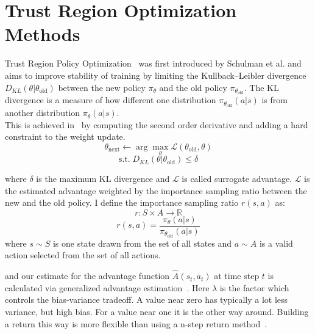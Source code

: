 \documentclass{article}
\begin{document}
\section{Trust Region Optimization Methods}

Trust Region Policy Optimization~\cite{pmlr-v37-schulman15} was first introduced by Schulman et al.
and aims to improve stability of training by limiting the Kullback–Leibler divergence $D_{KL}(\theta|\theta_{\text{old}})$
between the new policy $\pi_\theta$ and the old policy $\pi_{\theta_{\text{old}}}$. The KL divergence is a measure of how different
one distribution $\pi_{\theta_{\text{old}}}(a|s)$ is from another distribution $\pi_\theta(a|s)$.\\

\noindent This is achieved in~\cite{pmlr-v37-schulman15} by computing the second order derivative and adding 
a hard constraint to the weight update. 
\begin{equation}
    \theta_{\text{next}} \xleftarrow{} \arg \max_{\theta} {\mathcal L}(\theta_{\text{old}}, \theta) 
\end{equation}
\begin{equation*}
    \text{s.t.} \; {D}_{KL}(\theta|\theta_{\text{old}}) \leq \delta
\end{equation*}

\noindent where $\delta$ is the maximum KL divergence and ${\mathcal L}$ is called surrogate 
advantage. ${\mathcal L}$ is the estimated advantage weighted by the importance
sampling ratio between the new and the old policy. I define the importance sampling ratio $r(s, a)$ as:
\begin{equation}
    r : S \times A \xrightarrow{} \mathbb{R} 
\end{equation}
\begin{equation*}
    r(s, a) = \frac{\pi_{\theta}(a|s)}{\pi_{\theta_{\text{old}}}(a|s)}
\end{equation*}
where $s \sim S$ is one state drawn from the set of all states and $a \sim A$ is a
valid action selected from the set of all actions.

\noindent and our estimate for the advantage function $\hat A(s_t, a_t)$ at time step $t$ is
calculated via generalized advantage estimation~\cite{Schulmanetal_ICLR2016}. Here $\lambda$ is
the factor which controls the bias-variance tradeoff. A value near zero has typically a lot
less variance, but high bias. For a value near one it is the other way around.
Building a return this way is more flexible than using a n-step return method~\cite{DBLP:journals/corr/abs-2006-05990}.
\end{document}
